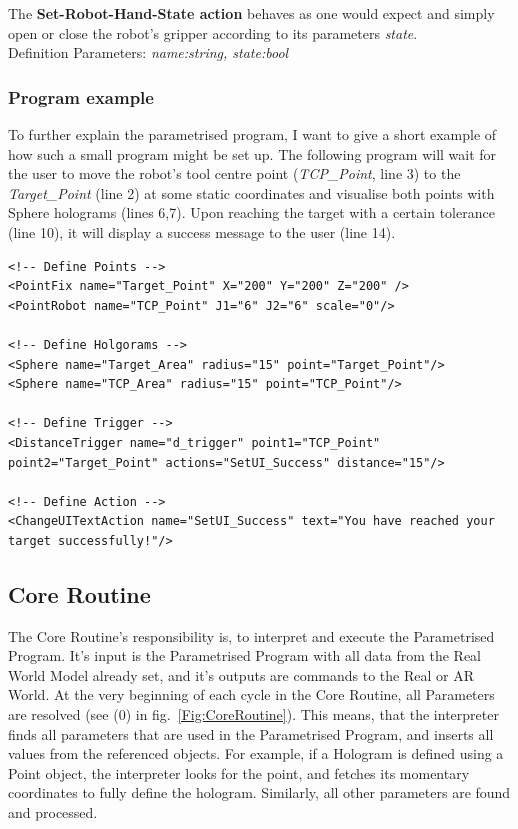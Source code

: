 The \textbf{Set-Robot-Hand-State action} behaves as one would expect and simply open or close the robot's gripper according to its parameters \textit{state}.\\Definition Parameters: \textit{name:string, state:bool}

\subsubsection{Program example}
To further explain the parametrised program, I want to give a short example of how such a small program might be set up. The following program will wait for the user to move the robot's tool centre point (\textit{TCP\_Point}, line 3) to the \textit{Target\_Point} (line 2) at some static coordinates and visualise both points with Sphere holograms (lines 6,7). Upon reaching the target with a certain tolerance (line 10), it will display a success message to the user (line 14).

\begin{lstlisting}
<!-- Define Points -->
<PointFix name="Target_Point" X="200" Y="200" Z="200" />
<PointRobot name="TCP_Point" J1="6" J2="6" scale="0"/>

<!-- Define Holgorams -->
<Sphere name="Target_Area" radius="15" point="Target_Point"/>
<Sphere name="TCP_Area" radius="15" point="TCP_Point"/>

<!-- Define Trigger -->
<DistanceTrigger name="d_trigger" point1="TCP_Point" point2="Target_Point" actions="SetUI_Success" distance="15"/>
	
<!-- Define Action -->
<ChangeUITextAction name="SetUI_Success" text="You have reached your target successfully!"/>
\end{lstlisting}


\subsection{Core Routine}
The Core Routine's responsibility is, to interpret and execute the Parametrised Program. It's input is the Parametrised Program with all data from the Real World Model already set, and it's outputs are commands to the Real or AR World. At the very beginning of each cycle in the Core Routine, all Parameters are resolved (see (0) in fig.~\ref{Fig:CoreRoutine}). This means, that the interpreter finds all parameters that are used in the Parametrised Program, and inserts all values from the referenced objects. For example, if a Hologram is defined using a Point object, the interpreter looks for the point, and fetches its momentary coordinates to fully define the hologram. Similarly, all other parameters are found and processed.


